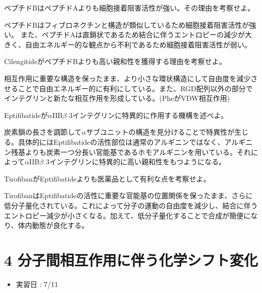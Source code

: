 \documentclass[a4paper,papersize,dvipdfmx]{jsarticle}
\begin{document}
\begin{tcolorbox}[colback=white,colbacktitle=black!10!white,coltitle=black,title={4}]
ペプチドBはペプチドAよりも細胞接着阻害活性が強い。その理由を考察せよ。
\end{tcolorbox}

ペプチドBはフィブロネクチンと構造が類似しているため細胞接着阻害活性が強い。
また、ペプチドAは直鎖状であるため結合に伴うエントロピーの減少が大きく、自由エネルギー的な観点から不利であるため細胞接着阻害活性が弱い。

\begin{tcolorbox}[colback=white,colbacktitle=black!10!white,coltitle=black,title={5}]
CilengitideがペプチドBよりも高い親和性を獲得する理由を考察せよ。
\end{tcolorbox}

相互作用に重要な構造を保ったまま、より小さな環状構造にして自由度を減少させることで自由エネルギー的に有利にしている。また、RGD配列以外の部分でインテグリンと新たな相互作用を形成している。(PheがVDW相互作用)

\begin{tcolorbox}[colback=white,colbacktitle=black!10!white,coltitle=black,title={6}]
Eptifibatideが$\alpha$IIB$\beta$ 3インテグリンに特異的に作用する機構を述べよ。
\end{tcolorbox}

炭素鎖の長さを調節して$\alpha$サブユニットの構造を見分けることで特異性が生じる。具体的にはEptifibatideの活性部位は通常のアルギニンではなく、アルギニン残基よりも炭素一つ分長い官能基であるホモアルギニンを用いている。それによって$\alpha$IIB$\beta$ 3インテグリンに特異的に高い親和性をもつようになる。

\begin{tcolorbox}[colback=white,colbacktitle=black!10!white,coltitle=black,title={7}]
TirofibanがEptifibatideよりも医薬品として有利な点を考察せよ。
\end{tcolorbox}

TirofibanはEptifibatideの活性に重要な官能基の位置関係を保ったまま、さらに低分子量化されている。これによって分子の運動の自由度を減少し、結合に伴うエントロピー減少が小さくなる。加えて、低分子量化することで合成が簡便になり、体内動態が良化する。


\part*{4 分子間相互作用に伴う化学シフト変化}

\begin{itemize}
\item 実習日 : 7/11

\end{itemize}
\end{document}
